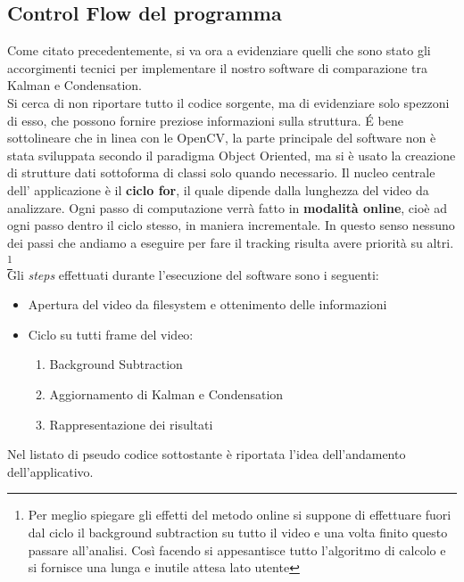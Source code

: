 \subsection{Control Flow del programma}\label{ControlFlow}
Come citato precedentemente, si va ora a evidenziare quelli che sono stato gli accorgimenti tecnici per implementare il nostro software di comparazione tra Kalman e Condensation.\\
Si cerca di non riportare tutto il codice sorgente, ma di evidenziare solo spezzoni di esso, che possono fornire preziose informazioni sulla struttura. \'E bene sottolineare che in linea con le OpenCV, la parte principale del software non è stata sviluppata secondo il paradigma Object Oriented, ma si è usato la creazione di strutture dati sottoforma di classi solo quando necessario.
Il nucleo centrale dell' applicazione è il \textbf{ciclo for}, il quale dipende dalla lunghezza del video da analizzare. Ogni passo di computazione verrà fatto in \textbf{modalità online}, cioè ad ogni passo dentro il ciclo stesso, in maniera incrementale. In questo senso nessuno dei passi che andiamo a eseguire per fare il tracking risulta avere priorità su altri. \footnote{Per meglio spiegare gli effetti del metodo online si suppone di effettuare fuori dal ciclo il background subtraction su tutto il video e una volta finito questo passare all'analisi. Così facendo si appesantisce tutto l'algoritmo di calcolo e si fornisce una lunga e inutile attesa lato utente} \\


Gli \textit{steps} effettuati durante l'esecuzione del software sono i seguenti:
\begin{itemize}
\item Apertura del video da filesystem e ottenimento delle informazioni
\item Ciclo su tutti frame del video:
	\begin{enumerate}
	\item Background Subtraction
	\item Aggiornamento di Kalman e Condensation
	\item Rappresentazione dei risultati 
	\end{enumerate}
\end{itemize}

Nel listato di pseudo codice sottostante è riportata l'idea dell'andamento dell'applicativo.


